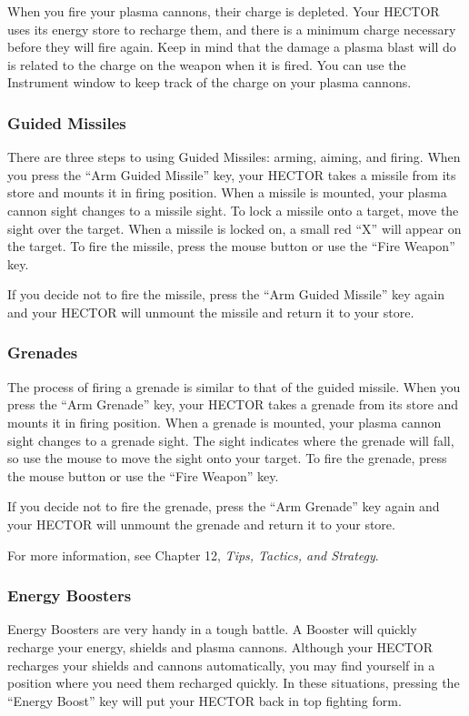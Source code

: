 \documentclass{article}
\begin{document}
When you fire your plasma cannons, their charge is depleted. Your HECTOR uses its energy store to recharge them, and there is a minimum charge necessary before they will fire again. Keep in mind that the damage a plasma blast will do is related to the charge on the weapon when it is fired. You can use the Instrument window to keep track of the charge on your plasma cannons.

\subsubsection{Guided Missiles}
There are three steps to using Guided Missiles: arming, aiming, and firing. When you press the ``Arm Guided Missile'' key, your HECTOR takes a missile from its store and mounts it in firing position. When a missile is mounted, your plasma cannon sight changes to a missile sight. To lock a missile onto a target, move the sight over the target. When a missile is locked on, a small red ``X'' will appear on the target. To fire the missile, press the mouse button or use the ``Fire Weapon'' key.

If you decide not to fire the missile, press the ``Arm Guided Missile'' key again and your HECTOR will unmount the missile and return it to your store.

\subsubsection{Grenades}
The process of firing a grenade is similar to that of the guided missile. When you press the ``Arm Grenade'' key, your HECTOR takes a grenade from its store and mounts it in firing position. When a grenade is mounted, your plasma cannon sight changes to a grenade sight. The sight indicates where the grenade will fall, so use the mouse to move the sight onto your target. To fire the grenade, press the mouse button or use the ``Fire Weapon'' key.

If you decide not to fire the grenade, press the ``Arm Grenade'' key again and your HECTOR will unmount the grenade and return it to your store.

For more information, see Chapter 12, \textit{Tips, Tactics, and Strategy}.

\subsubsection{Energy Boosters}
Energy Boosters are very handy in a tough battle. A Booster will quickly recharge your energy, shields and plasma cannons. Although your HECTOR recharges your shields and cannons automatically, you may find yourself in a position where you need them recharged quickly. In these situations, pressing the ``Energy Boost'' key will put your HECTOR back in top fighting form.
\end{document}
